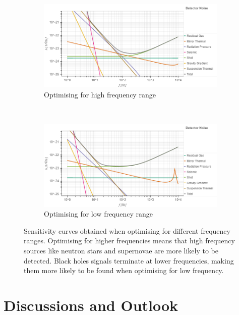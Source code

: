 \documentclass{article}
\begin{document}
    \begin{figure}[h!]
\centering
\begin{subfigure}{.8\textwidth}
        \centering
\includegraphics[width=1\linewidth, trim = {0 0 0 1cm}, clip]{HighFreq.png}
         \caption{Optimising for high frequency range}
         \end{subfigure}%
         \\
        \begin{subfigure}{.8\textwidth}
        \centering
        \includegraphics[width=1\linewidth, trim = {0 0 0 0.9cm}, clip]
{LowFreq.png}
         \caption{Optimising for low frequency range}
         \end{subfigure}
         \caption{Sensitivity curves obtained when optimising for
           different frequency ranges. Optimising for higher
           frequencies means that high frequency sources like neutron
           stars and supernovae are more likely to be detected. Black
           holes signals terminate at lower frequencies, making them
           more likely to be found when optimising for low frequency.}
         \label{fig::LowHighFreq}
 \end{figure}

\section{Discussions and Outlook}
\end{document}
